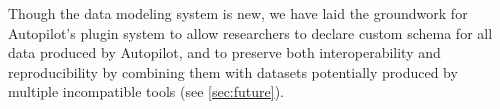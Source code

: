 Though the data modeling system is new, we have laid the groundwork for Autopilot's plugin system to allow researchers to declare custom schema for all data produced by Autopilot, and to preserve both interoperability and reproducibility by combining them with datasets potentially produced by multiple incompatible tools (see \ref{sec:future}).



